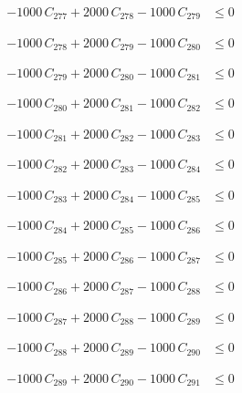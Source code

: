 \documentclass[a4paper,11pt]{article}
\begin{document}
\begin{align}
-1000\,C_{277} + 2000\,C_{278} - 1000\,C_{279} &\leq 0 \nonumber
\end{align}

\begin{align}
-1000\,C_{278} + 2000\,C_{279} - 1000\,C_{280} &\leq 0 \nonumber
\end{align}

\begin{align}
-1000\,C_{279} + 2000\,C_{280} - 1000\,C_{281} &\leq 0 \nonumber
\end{align}

\begin{align}
-1000\,C_{280} + 2000\,C_{281} - 1000\,C_{282} &\leq 0 \nonumber
\end{align}

\begin{align}
-1000\,C_{281} + 2000\,C_{282} - 1000\,C_{283} &\leq 0 \nonumber
\end{align}

\begin{align}
-1000\,C_{282} + 2000\,C_{283} - 1000\,C_{284} &\leq 0 \nonumber
\end{align}

\begin{align}
-1000\,C_{283} + 2000\,C_{284} - 1000\,C_{285} &\leq 0 \nonumber
\end{align}

\begin{align}
-1000\,C_{284} + 2000\,C_{285} - 1000\,C_{286} &\leq 0 \nonumber
\end{align}

\begin{align}
-1000\,C_{285} + 2000\,C_{286} - 1000\,C_{287} &\leq 0 \nonumber
\end{align}

\begin{align}
-1000\,C_{286} + 2000\,C_{287} - 1000\,C_{288} &\leq 0 \nonumber
\end{align}

\begin{align}
-1000\,C_{287} + 2000\,C_{288} - 1000\,C_{289} &\leq 0 \nonumber
\end{align}

\begin{align}
-1000\,C_{288} + 2000\,C_{289} - 1000\,C_{290} &\leq 0 \nonumber
\end{align}

\begin{align}
-1000\,C_{289} + 2000\,C_{290} - 1000\,C_{291} &\leq 0 \nonumber
\end{align}
\end{document}
